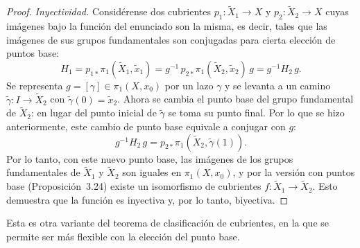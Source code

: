 \documentclass[11pt]{article}
\begin{document}
\begin{proof}
\medskip\noindent\emph{Inyectividad.} Considérense dos cubrientes $p_1\colon\tilde X_1\to X$ y $p_2\colon\tilde X_2\to X$ cuyas imágenes bajo la función del enunciado son la misma, es decir, tales que las imágenes de sus grupos fundamentales son conjugadas para cierta elección de puntos base:
\[
  H_1=p_{1*}\pi_1(\tilde X_1,\tilde x_1)=g^{-1}\,p_{2*}\pi_1(\tilde X_2,\tilde x_2)\,g=g^{-1}H_2\,g .
\]
Se representa $g=[\gamma]\in\pi_1(X,x_0)$ por un lazo $\gamma$ y se levanta a un camino $\tilde\gamma\colon I\to\tilde X_2$ con $\tilde\gamma(0)=\tilde x_2$. Ahora se cambia el punto base del grupo fundamental de $\tilde X_2$: en lugar del punto inicial de $\tilde\gamma$ se toma su punto final. Por lo que se hizo anteriormente, este cambio de punto base equivale a conjugar con $g$:
\[
  g^{-1}H_2\,g=p_{2*}\pi_1(\tilde X_2,\tilde\gamma(1)).
\]
Por lo tanto, con este nuevo punto base, las imágenes de los grupos fundamentales de $\tilde X_1$ y $\tilde X_2$ son iguales en $\pi_1(X,x_0)$, y por la versión con puntos base (Proposición~3.24) existe un isomorfismo de cubrientes $f\colon\tilde X_1\to\tilde X_2$. Esto demuestra que la función es inyectiva y, por lo tanto, biyectiva.
\end{proof}

Esta es otra variante del teorema de clasificación de cubrientes, en la que se permite ser más flexible con la elección del punto base.
\end{document}
